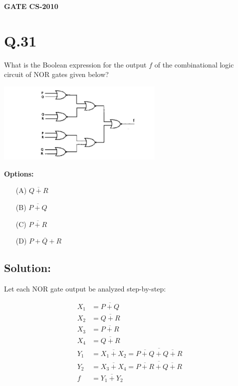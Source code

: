 \documentclass[12pt,a4paper]{article}
\begin{document}
\pagestyle{fancy}
\fancyhf{}
\begin{center}
\textbf{GATE CS-2010}
\end{center}

\section*{Q.31}
What is the Boolean expression for the output $f$ of the combinational logic circuit of NOR gates given below? 

\begin{center}
\includegraphics[width=0.6\textwidth]{31.jpg}
\end{center}

\noindent
\textbf{Options:}
\begin{enumerate}
\item[(A)] $\overline{Q + R}$
\item[(B)] $\overline{P + Q}$
\item[(C)] $\overline{P + R}$
\item[(D)] $\overline{P + Q + R}$
\end{enumerate}

\subsection*{Solution:}
Let each NOR gate output be analyzed step-by-step:

\begin{align*}
X_1 &= \overline{P + Q} \\
X_2 &= \overline{Q + R} \\
X_3 &= \overline{P + R} \\
X_4 &= \overline{Q + R} \\
Y_1 &= \overline{X_1 + X_2} 
    = \overline{\overline{P + Q} + \overline{Q + R}} \\
Y_2 &= \overline{X_3 + X_4} 
    = \overline{\overline{P + R} + \overline{Q + R}} \\
f &= \overline{Y_1 + Y_2}
\end{align*}
\end{document}

